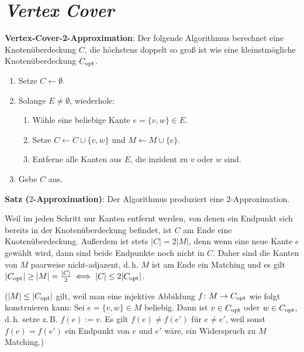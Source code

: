 \pagebreak

\section{%
    \emph{Vertex Cover}%
}

\textbf{Vertex-Cover-2-Approximation}:
Der folgende Algorithmus berechnet eine Knotenüberdeckung $C$, die höchstens doppelt so
groß ist wie eine kleinstmögliche Knotenüberdeckung $C_{\text{opt}}$.
\begin{enumerate}
    \item
    Setze $C \leftarrow \emptyset$.

    \item
    Solange $E \not= \emptyset$, wiederhole:
    \begin{enumerate}
        \item
        Wähle eine beliebige Kante $e = \{v, w\} \in E$.

        \item
        Setze $C \leftarrow C \cup \{v, w\}$ und $M \leftarrow M \cup \{e\}$.

        \item
        Entferne alle Kanten aus $E$, die inzident zu $v$ oder $w$ sind.
    \end{enumerate}

    \item
    Gebe $C$ aus.
\end{enumerate}

\linie

\textbf{Satz ($2$-Approximation)}:
Der Algorithmus produziert eine $2$-Approximation.

\begin{Beweis}
    Weil im jeden Schritt nur Kanten entfernt werden, von denen ein Endpunkt sich bereits in der
    Knotenüberdeckung befindet, ist $C$ am Ende eine Knotenüberdeckung.
    Außerdem ist stets $|C| = 2|M|$, denn wenn eine neue Kante $e$ gewählt wird, dann sind beide
    Endpunkte noch nicht in $C$.
    Daher sind die Kanten von $M$ paarweise nicht-adjazent,
    d.\,h. $M$ ist am Ende ein Matching und es gilt
    $|C_{\text{opt}}| \ge |M| = \frac{|C|}{2} \iff |C| \le 2|C_{\text{opt}}|$.

    ($|M| \le |C_{\text{opt}}|$ gilt, weil man eine injektive Abbildung
    $f\colon M \to C_{\text{opt}}$ wie folgt konstruieren kann:
    Sei $e = \{v, w\} \in M$ beliebig.
    Dann ist $v \in C_{\text{opt}}$ oder $w \in C_{\text{opt}}$, d.\,h. setze z.\,B. $f(e) := v$.
    Es gilt $f(e) \not= f(e')$ für $e \not= e'$,
    weil sonst $f(e) = f(e')$ ein Endpunkt von $e$ und $e'$ wäre,
    ein Widerspruch zu $M$ Matching.)
\end{Beweis}

